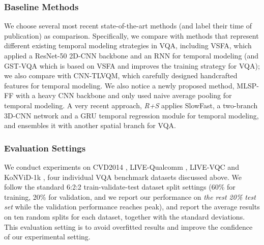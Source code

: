 \documentclass[journal]{IEEEtran}
\begin{document}
\subsubsection{Baseline Methods}
We choose several most recent state-of-the-art methods (and label their time of publication) as comparison. Specifically, we compare with methods that represent different existing temporal modeling strategies in VQA, including VSFA\cite{vsfa}, which applied a ResNet-50 2D-CNN backbone and an RNN for temporal modeling (and GST-VQA\cite{gstvqa} which is based on VSFA and improves the training strategy for VQA); we also compare with CNN-TLVQM\cite{cnntlvqm}, which carefully designed handcrafted features for temporal modeling. We also notice a newly proposed method, MLSP-FF\cite{mlsp} with a heavy CNN backbone and only used naive average pooling for temporal modeling. A very recent approach, \textit{R+S} applies SlowFast\cite{slowfast}, a two-branch 3D-CNN network and a GRU\cite{gru} temporal regression module for temporal modeling, and ensembles it with another spatial branch for VQA.



\subsubsection{Evaluation Settings} \label{sec:intra}
We conduct experiments on CVD2014 \cite{cvd}, LIVE-Qualcomm \cite{qualcomm}, LIVE-VQC \cite{vqc} and KoNViD-1k \cite{kv1k}, four individual VQA benchmark datasets discussed above. We follow the standard 6:2:2 train-validate-test dataset split settings (60\% for training, 20\% for validation, and we report our performance on \textit{the rest 20\% test set} while the validation performance reaches peak), and report the average results on ten random splits for each dataset, together with the standard deviations. This evaluation setting is to avoid overfitted results and improve the confidence of our experimental setting. 
\end{document}
